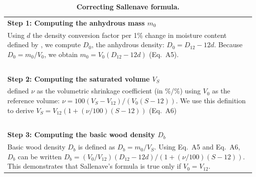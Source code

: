 \documentclass[a4paper, 12pt, leqno, dvipsnames]{article}\usepackage[]{graphicx}\usepackage[]{color}
\begin{document}
\begin{longtable}{@{}L{\textwidth}@{}}
  \caption{\textbf{Correcting Sallenave formula.}}\label{sm:Correction}\\
  \textbf{Step 1: Computing the anhydrous mass $m_0$}\\
  Using $d$ the density conversion factor per 1\% change in moisture content defined by \citet{Sallenave1955},
  we compute $D_0$, the anhydrous density: $D_0=D_{12}-12d$.
  Because $D_0=m_0/V_0$, we obtain $m_0=V_0 (D_{12}-12d)$ (Eq.~A5).\\
  ~\\
  \textbf{Step 2: Computing the saturated volume $V_S$}\\
  \citet{Sallenave1955} defined $\nu$ as the volumetric shrinkage coefficient (in \%/\%) using $V_0$
  as the reference volume: $\nu=100(V_S-V_{12})/(V_0 (S-12))$.
  We use this definition to derive $V_S=V_{12}(1+(\nu/100)(S-12))$ (Eq.~A6)\\
  ~\\
  \textbf{Step 3: Computing the basic wood density $D_b$}\\
  Basic wood density $D_b$ is defined as $D_b=m_0/V_S$. Using Eq.~A5 and Eq.~A6, $D_b$ can
  be written $D_b=(V_0/V_{12})(D_{12}-12d)/(1+(\nu/100)(S-12))$.
  This demonstrates that Sallenave's formula is true only if $V_0=V_{12}$.\\
\end{longtable}
\end{document}
